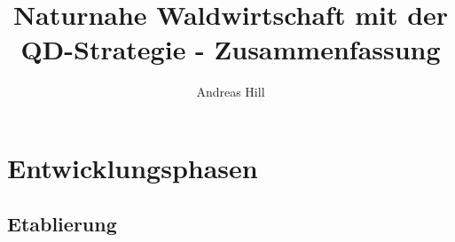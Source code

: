 \documentclass{article}
\title{Naturnahe Waldwirtschaft mit der QD-Strategie - Zusammenfassung\\\vspace{1cm}}
\author{\large Andreas Hill}
\begin{document}

\maketitle
\thispagestyle{empty}
\newpage

\setcounter{page}{1}

\pagestyle{fancy} %
\fancyfoot[C]{\thepage}
\setlength{\headsep}{15mm}



\section{Entwicklungsphasen}

\subsection{Etablierung}
\end{document}
